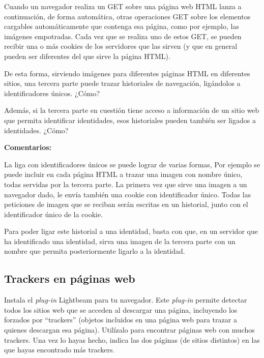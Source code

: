 Cuando un navegador realiza un GET sobre una página web HTML lanza a continuación, de forma automática, otras operaciones GET sobre los elementos cargables automáticamente que contenga esa página, como por ejemplo, las imágenes empotradas. Cada vez que se realiza uno de estos GET, se pueden recibir una o más cookies de los servidores que las sirven (y que en general pueden ser diferentes del que sirve la página HTML).

De esta forma, sirviendo imágenes para diferentes páginas HTML en diferentes sitios, una tercera parte puede trazar historiales de navegación, ligándolos a identificadores únicos. ¿Cómo?

Además, si la tercera parte en cuestión tiene acceso a información de un sitio web que permita identificar identidades, esos historiales pueden también ser ligados a identidades. ¿Cómo?

\textbf{Comentarios:}

La liga con identificadores únicos se puede lograr de varias formas, Por ejemplo se puede incluir en cada página HTML a trazar una imagen con nombre único, todas servidas por la tercera parte. La primera vez que sirve una imagen a un navegador dado, le envía también una cookie con identificador único. Todas las peticiones de imagen que se reciban serán escritas en un historial, junto con el identificador único de la cookie.

Para poder ligar este historial a una identidad, basta con que, en un servidor que ha identificado una identidad, sirva una imagen de la tercera parte con un nombre que permita posteriormente ligarlo a la identidad.

\subsection{Trackers en páginas web}
\label{subsec:trackers-paginas-web}

Instala el \emph{plug-in} Lightbeam para tu navegador. Este \emph{plug-in} permite detectar todos los sitios web que se acceden al descargar una página, incluyendo los forzados por ``trackers'' (objetos incluidos en una página web para trazar a quienes descargan esa página). Utilízalo para encontrar páginas web con muchos trackers. Una vez lo hayas hecho, indica las dos páginas (de sitios distintos) en las que hayas encontrado más trackers.

